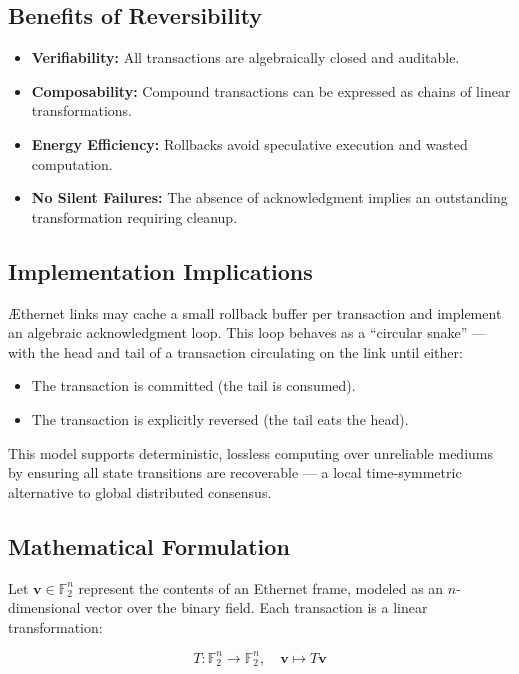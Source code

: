 \documentclass[../../../OAE-SPEC-MAIN.tex]{subfiles}
\begin{document}
\subsection*{Benefits of Reversibility}

\begin{itemize}
  \item \textbf{Verifiability:} All transactions are algebraically closed and auditable.
  \item \textbf{Composability:} Compound transactions can be expressed as chains of linear transformations.
  \item \textbf{Energy Efficiency:} Rollbacks avoid speculative execution and wasted computation.
  \item \textbf{No Silent Failures:} The absence of acknowledgment implies an outstanding transformation requiring cleanup.
\end{itemize}

\subsection*{Implementation Implications}

\AE thernet links may cache a small rollback buffer per transaction and implement an algebraic acknowledgment loop. This loop behaves as a “circular snake” — with the head and tail of a transaction circulating on the link until either:
\begin{itemize}
  \item The transaction is committed (the tail is consumed).
  \item The transaction is explicitly reversed (the tail eats the head).
\end{itemize}

This model supports deterministic, lossless computing over unreliable mediums by ensuring all state transitions are recoverable — a local time-symmetric alternative to global distributed consensus.

\subsection*{Mathematical Formulation}

Let $\mathbf{v} \in \mathbb{F}_2^n$ represent the contents of an Ethernet frame, modeled as an $n$-dimensional vector over the binary field. Each transaction is a linear transformation:

\[
T: \mathbb{F}_2^n \rightarrow \mathbb{F}_2^n,\quad \mathbf{v} \mapsto T\mathbf{v}
\]
\end{document}
